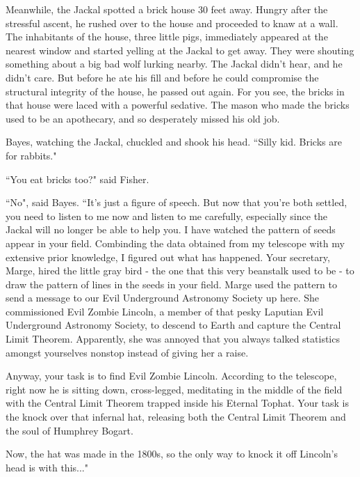 \documentclass{article}
\begin{document}
Meanwhile, the Jackal spotted a brick house 30 feet away. Hungry after the stressful ascent, he rushed over to the house and proceeded to knaw at a wall. The inhabitants of the house, three little pigs, immediately appeared at the nearest window and started yelling at the Jackal to get away. They were shouting something about a big bad wolf lurking nearby. The Jackal didn't hear, and he didn't care. But before he ate his fill and before he could compromise the structural integrity of the house, he passed out again. For you see, the bricks in that house were laced with a powerful sedative. The mason who made the bricks used to be an apothecary, and so desperately missed his old job. \newline

Bayes, watching the Jackal, chuckled and shook his head. ``Silly kid. Bricks are for rabbits." \newline

``You eat bricks too?" said Fisher. \newline

``No", said Bayes. ``It's just a figure of speech. But now that you're both settled, you need to listen to me now and listen to me carefully, especially since the Jackal will no longer be able to help you. I have watched the pattern of seeds appear in your field. Combinding the data obtained from my telescope with my extensive prior knowledge, I figured out what has happened. Your secretary, Marge, hired the little gray bird - the one that this very beanstalk used to be - to draw the pattern of lines in the seeds in your field. Marge used the pattern to send a message to our Evil Underground Astronomy Society up here. She commissioned Evil Zombie Lincoln, a member of that pesky Laputian Evil Underground Astronomy Society, to descend to Earth and capture the Central Limit Theorem. Apparently, she was annoyed that you always talked statistics amongst yourselves nonstop instead of giving her a raise. \newline

Anyway, your task is to find Evil Zombie Lincoln. According to the telescope, right now he is sitting down, cross-legged, meditating in the middle of the field with the Central Limit Theorem trapped inside his Eternal Tophat. Your task is the knock over that infernal hat, releasing both the Central Limit Theorem and the soul of Humphrey Bogart. \newline

Now, the hat was made in the 1800s, so the only way to knock it off Lincoln's head is with this..." \newline
\end{document}
